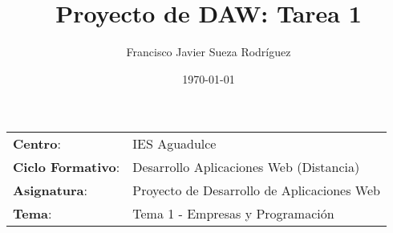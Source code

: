 


\title{
\vspace{10ex}
\normalfont \normalsize
\huge \textbf{Proyecto de DAW: Tarea 1}
}
\author{Francisco Javier Sueza Rodríguez}
\date{\normalsize\today}




\maketitle

\thispagestyle{empty}

\vspace{65ex}

\begin{center}
    \begin{tabular}{l l}
        \textbf{Centro}: & IES Aguadulce \\
        \textbf{Ciclo Formativo}: & Desarrollo Aplicaciones Web (Distancia)\\
        \textbf{Asignatura}: & Proyecto de Desarrollo de Aplicaciones Web\\
        \textbf{Tema}: & Tema 1 - Empresas y Programación\\
    \end{tabular}
\end{center}

\newpage

\tableofcontents

\newpage

\section{}

%

